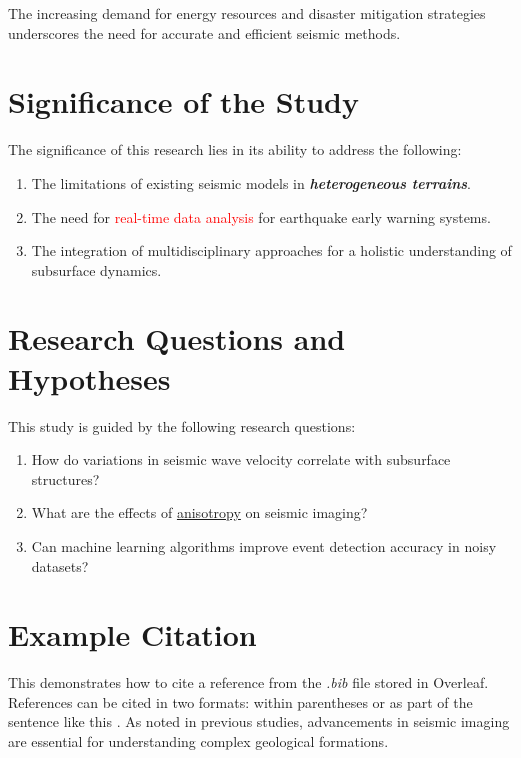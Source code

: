 The increasing demand for energy resources and disaster mitigation strategies underscores the need for accurate and efficient seismic methods.

\section{Significance of the Study}
The significance of this research lies in its ability to address the following:
\begin{enumerate}
    \item The limitations of existing seismic models in \textbf{\textit{heterogeneous terrains}}.
    \item The need for \textcolor{red}{real-time data analysis} for earthquake early warning systems.
    \item The integration of multidisciplinary approaches for a holistic understanding of subsurface dynamics.
\end{enumerate}

\section{Research Questions and Hypotheses}
This study is guided by the following research questions:
\begin{enumerate}
    \item How do variations in seismic wave velocity correlate with subsurface structures?
    \item What are the effects of \underline{anisotropy} on seismic imaging?
    \item Can machine learning algorithms improve event detection accuracy in noisy datasets?
\end{enumerate}



\section*{Example Citation}
This demonstrates how to cite a reference from the \textit{.bib} file stored in Overleaf. References can be cited in two formats: within parentheses \parencite{babu_stress_2024} or as part of the sentence like this \textcite{babu_stress_2024}. As noted in previous studies, advancements in seismic imaging are essential for understanding complex geological formations.\par

